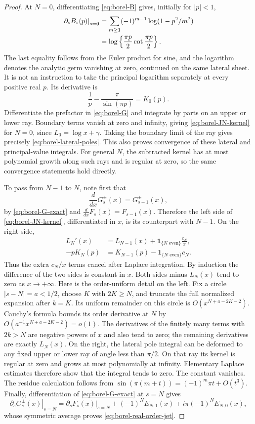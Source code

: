 \documentclass[11pt,a4paper]{article}
\numberwithin{equation}{section}
\theoremstyle{definition}
\theoremstyle{remark}
\begin{document}
\begin{proof}
At $N=0$, differentiating \eqref{eq:borel-B} gives, initially for
$|p|<1$,
\begin{align}
 \left.\partial_sB_s(p)\right|_{s=0}
 &=\sum_{m\geq1}(-1)^{m-1}\log(1-p^2/m^2)\notag\\
 &=\log\left\{\frac{\pi p}{2}\cot\frac{\pi p}{2}\right\}.
 \label{eq:borel-logcot}
\end{align}
The last equality follows from the Euler product for sine, and the
logarithm denotes the analytic germ vanishing at zero, continued on the
same lateral sheet. It is not an instruction to take the principal
logarithm separately at every positive real $p$. Its derivative is
\[
 \frac1p-\frac{\pi}{\sin(\pi p)}=K_0(p).
\]
Differentiate the prefactor in \eqref{eq:borel-G} and integrate by parts
on an upper or lower ray. Boundary terms vanish at zero and infinity,
giving \eqref{eq:borel-JN-kernel} for $N=0$, since $L_0=\log x+\gamma$.
Taking the boundary limit of the ray gives precisely
\eqref{eq:borel-lateral-poles}. This also proves convergence of these
lateral and principal-value integrals. For general $N$, the subtracted
kernel has at most polynomial growth along such rays and is regular at
zero, so the same convergence statements hold directly.

To pass from $N-1$ to $N$, note first that
\[
 \frac{d}{dx}G_s^{\pm}(x)=G_{s-1}^{\pm}(x),
\]
by \eqref{eq:borel-G-exact} and
$\frac{d}{dx}F_s(x)=F_{s-1}(x)$. Therefore the left side of
\eqref{eq:borel-JN-kernel}, differentiated in $x$, is its counterpart
with $N-1$. On the right side,
\begin{align*}
 L_N'(x)&=L_{N-1}(x)+
          \mathbf1_{\{N\text{ even}\}}\frac{c_N}{x},\\
 -pK_N(p)&=K_{N-1}(p)-
          \mathbf1_{\{N\text{ even}\}}c_N.
\end{align*}
Thus the extra $c_N/x$ terms cancel after Laplace integration. By
induction the difference of the two sides is constant in $x$.
Both sides minus $L_N(x)$ tend to zero as $x\to+\infty$.
Here is the order-uniform detail on the left. Fix a circle
$|s-N|=a<1/2$, choose $K$ with $2K\geq N$, and truncate the full
normalized expansion after $k=K$. Its uniform remainder on this circle
is $O(x^{N+a-2K-2})$. Cauchy's formula bounds its order derivative at
$N$ by $O(a^{-1}x^{N+a-2K-2})=o(1)$. The derivatives of the finitely
many terms with $2k>N$ are negative powers of $x$ and also tend to zero;
the remaining derivatives are exactly $L_N(x)$. On the right, the
lateral pole integral can be deformed to any fixed upper or lower ray
of angle less than $\pi/2$. On that ray its kernel is regular at zero
and grows at most polynomially at infinity. Elementary Laplace
estimates therefore show that the integral tends to zero. The
constant vanishes. The residue calculation follows from
$\sin(\pi(m+t))=(-1)^m\pi t+O(t^3)$.
Finally, differentiation of \eqref{eq:borel-G-exact} at $s=N$ gives
\[
 \left.\partial_sG_s^{\pm}(x)\right|_{s=N}
 =\left.\partial_sF_s(x)\right|_{s=N}
 +(-1)^NE_{N,1}(x)\mp i\pi(-1)^NE_{N,0}(x),
\]
whose symmetric average proves \eqref{eq:borel-real-order-jet}.
\end{proof}
\end{document}
